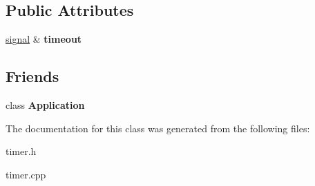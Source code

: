\subsection*{Public Attributes}
\begin{DoxyCompactItemize}
\item 
\hypertarget{class_tempest_1_1_timer_a20ced2544e9b8229fc30c0ab26c25058}{\hyperlink{class_tempest_1_1signal}{signal} \& {\bfseries timeout}}\label{class_tempest_1_1_timer_a20ced2544e9b8229fc30c0ab26c25058}

\end{DoxyCompactItemize}
\subsection*{Friends}
\begin{DoxyCompactItemize}
\item 
\hypertarget{class_tempest_1_1_timer_a23f25bcc02a0e94c2f5a4188496b04d0}{class {\bfseries Application}}\label{class_tempest_1_1_timer_a23f25bcc02a0e94c2f5a4188496b04d0}

\end{DoxyCompactItemize}


The documentation for this class was generated from the following files\+:\begin{DoxyCompactItemize}
\item 
timer.\+h\item 
timer.\+cpp\end{DoxyCompactItemize}

